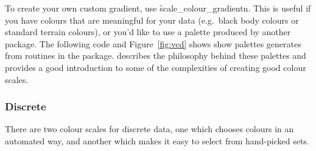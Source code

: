 % 



To create your own custom gradient, use \f{scale_colour_gradientn}. This is useful if you have colours that are meaningful for your data (e.g.\ black body colours or standard terrain colours), or you'd like to use a palette produced by another package. The following code and Figure~\ref{fig:vcd} shows show palettes generates from routines in the  package. \citep{zeileis:2008} describes the philosophy behind these palettes and provides a good introduction to some of the complexities of creating good colour scales.

% 


\subsubsection{Discrete}
\label{ssub:colour-discrete}

There are two colour scales for discrete data, one which chooses colours in an automated way, and another which makes it easy to select from hand-picked sets.

